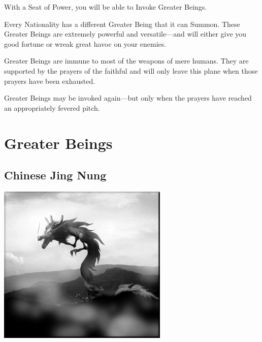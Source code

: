 With a Seat of Power, you will be able to Invoke Greater Beings.

Every Nationality has a different Greater Being that it can Summon. These Greater Beings are extremely powerful and versatile---and will either give you good fortune or wreak great havoc on your enemies.

Greater Beings are immune to most of the weapons of mere humans. They are supported by the prayers of the faithful and will only leave this plane when those prayers have been exhausted.

Greater Beings may be invoked again---but only when the prayers have reached an appropriately fevered pitch.

\clearpage %

\section{Greater Beings}

\subsection{Chinese Jing Nung}


\begin{center}
	\includegraphics[width=1\linewidth]{Ajingnung}
\end{center}

